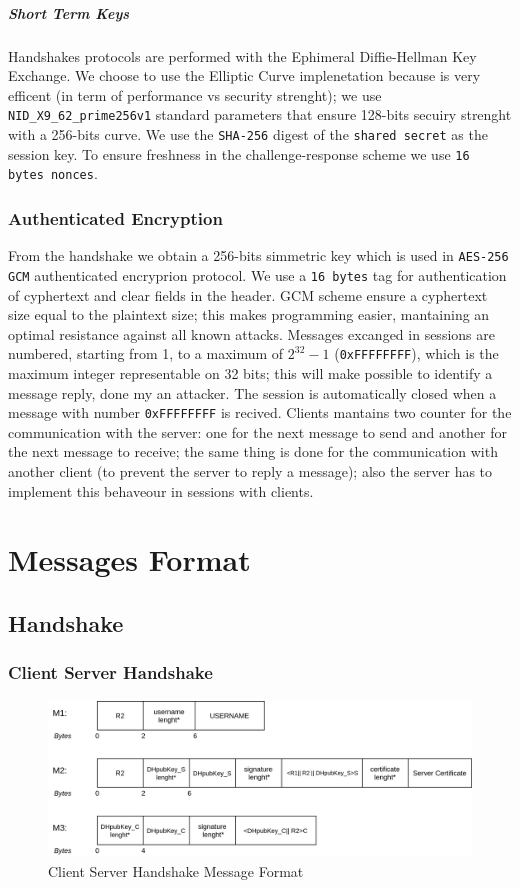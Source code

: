 \documentclass[11pt]{report}
\begin{document}
\paragraph*{Short Term Keys}
Handshakes protocols are performed with the Ephimeral Diffie-Hellman Key Exchange. 
We choose to use the Elliptic Curve implenetation because is very efficent (in term of performance vs security strenght);
we use \verb|NID_X9_62_prime256v1| standard parameters that ensure 128-bits secuiry strenght with a 256-bits curve. We use the \texttt{SHA-256} digest of the \texttt{shared secret} as
the session key.
To ensure freshness in the challenge-response scheme we use \texttt{16 bytes nonces}.
\subsection{Authenticated Encryption}
From the handshake we obtain a 256-bits simmetric key which is used in \texttt{AES-256 GCM} authenticated encryprion protocol.
We use a \texttt{16 bytes} tag for authentication of cyphertext and clear fields in the header. GCM scheme ensure a cyphertext
size equal to the plaintext size; this makes programming easier, mantaining an optimal resistance against all known attacks.
Messages excanged in sessions are numbered, starting from 1, to a maximum of $2^{32}-1$ (\verb|0xFFFFFFFF|), which is the
maximum integer representable on 32 bits; this will make possible to identify a message reply, done
my an attacker. The session is automatically closed when a message with number \verb|0xFFFFFFFF| is recived.
Clients mantains two counter for the communication with the server:  one for the next message to send and another for
the next message to receive; the same thing is done for the communication with another client (to prevent the server to 
reply a message); also the server has to implement this behaveour in sessions with clients.
\chapter{Messages Format}

\section{Handshake}
\subsection*{Client Server Handshake}
\begin{figure}[H]
	\centering
	\includegraphics[scale=0.19]{img/AuthClientServer_messageFormat.png}
	\caption{Client Server Handshake Message Format}
	\label {img: FormatClientServer}
\end{figure}
\end{document}
